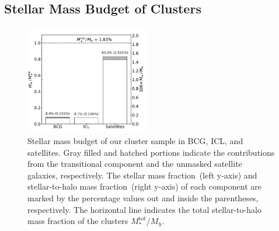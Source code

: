 \documentclass[fleqn,usenatbib]{mnras}
\begin{document}
\subsection{Stellar Mass Budget of Clusters}
\label{subsec:budget}



\begin{figure}
    \includegraphics[width=0.48\textwidth]{fig/ICL_star_mass_fraction.pdf}
    \caption{Stellar mass budget of our cluster sample in BCG, ICL, and
    satellites. Gray filled and hatched portions indicate the contributions
    from the transitional component and the unmasked satellite galaxies,
    respectively. The stellar mass fraction~(left y-axis) and
    stellar-to-halo mass fraction~(right y-axis) of each component are
    marked by the percentage values out and inside the parentheses,
    respectively. The horizontal line indicates the total stellar-to-halo
    mass fraction of the clusters $M_*^{\mathrm{tot}}/M_h$.
    \label{fig:budget} }
\end{figure}
\end{document}
